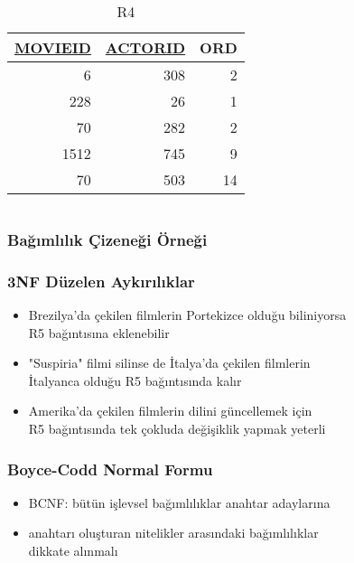 \documentclass[dvipsnames]{beamer}
\theoremstyle{theorem}
\begin{document}
\begin{frame}
\begin{columns}[t]
    \begin{footnotesize}
    \begin{table}
      \caption{R4}
      \begin{tabular}{|r|r|r|}\hline
\underline{MOVIEID} & \underline{ACTORID} & ORD\\[2pt]\hline\hline
   6 & 308 &  2\\\hline
 228 &  26 &  1\\\hline
  70 & 282 &  2\\\hline
1512 & 745 &  9\\\hline
  70 & 503 & 14\\\hline
      \end{tabular}
    \end{table}
    \end{footnotesize}
  \end{columns}
\end{frame}

\begin{frame}
  \frametitle{Bağımlılık Çizeneği Örneği}

  \begin{center}
  \end{center}
\end{frame}

\begin{frame}
  \frametitle{3NF Düzelen Aykırılıklar}
  
  \hyperlink{example_db_3}{}

    \begin{itemize}
      \item Brezilya'da çekilen filmlerin Portekizce olduğu biliniyorsa\\
	R5 bağıntısına eklenebilir

      \pause
      \medskip
      \item "Suspiria" filmi silinse de İtalya'da çekilen filmlerin\\
	İtalyanca olduğu R5 bağıntısında kalır

      \pause
      \medskip
      \item Amerika'da çekilen filmlerin dilini güncellemek için\\
	R5 bağıntısında tek çokluda değişiklik yapmak yeterli
    \end{itemize}
\end{frame}

\begin{frame}
  \frametitle{Boyce-Codd Normal Formu}

  \begin{itemize}
    \item \alert{BCNF}: bütün işlevsel bağımlılıklar anahtar adaylarına
    \item anahtarı oluşturan nitelikler arasındaki bağımlılıklar\\
      dikkate alınmalı
  \end{itemize}
\end{frame}
\end{document}

